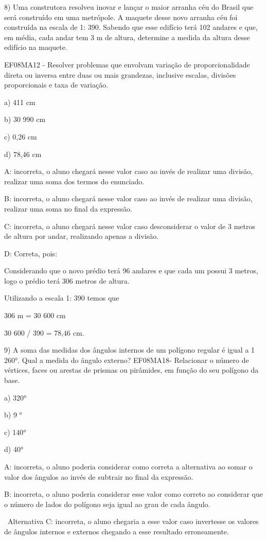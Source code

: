 8) Uma construtora resolveu inovar e lançar o maior arranha céu do
Brasil que será construído em uma metrópole. A maquete desse novo
arranha céu foi construída na escala de 1: 390. Sabendo que esse
edifício terá 102 andares e que, em média, cada andar tem 3 m de altura,
determine a medida da altura desse edifício na maquete.

EF08MA12 - Resolver problemas que envolvam variação de proporcionalidade
direta ou inversa entre duas ou mais grandezas, inclusive escalas,
divisões proporcionais e taxa de variação.

a) 411 cm

b) 30 990 cm

c) 0,26 cm

d) 78,46 cm

A: incorreta, o aluno chegará nesse valor caso ao invés de realizar uma
divisão, realizar uma soma dos termos do enunciado.

B: incorreta, o aluno chegará nesse valor caso ao invés de realizar uma
divisão, realizar uma soma no final da expressão.

C: incorreta, o aluno chegará nesse valor caso desconsiderar o valor de
3 metros de altura por andar, realizando apenas a divisão.

D: Correta, pois:

Considerando que o novo prédio terá 96 andares e que cada um possui 3
metros, logo o prédio terá 306 metros de altura.

Utilizando a escala 1: 390 temos que

306 m = 30 600 cm

30 600 / 390 = 78,46 cm.

9) A soma das medidas dos ângulos internos de um polígono regular é
igual a 1 260°. Qual a medida do ângulo externo? EF08MA18- Relacionar o
número de vértices, faces ou arestas de prismas ou pirâmides, em função
do seu polígono da base.

a) 320°

b) 9 °

c) 140°

d) 40°

A: incorreta, o aluno poderia considerar como correta a alternativa ao
somar o valor dos ângulos ao invés de subtrair no final da expressão.

B: incorreta, o aluno poderia considerar esse valor como correto ao
considerar que o número de lados do polígono seja igual ao grau de cada
ângulo.

~Alternativa C: incorreta, o aluno chegaria a esse valor caso invertesse
os valores de ângulos internos e externos chegando a esse resultado
erroneamente.

